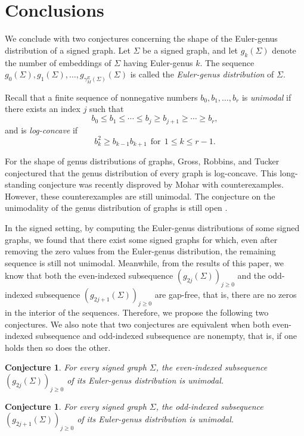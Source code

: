 \documentclass[12pt]{article}
\newtheorem{conjecture}[theorem]{Conjecture}
\theoremstyle{definition}
\begin{document}
\section{Conclusions}\label{Sec:5}

We conclude with two conjectures concerning the shape of the Euler-genus distribution of a signed graph. Let $\Sigma$ be a signed graph, and let $g_k(\Sigma)$ denote the number of embeddings of $\Sigma$ having Euler-genus $k$. The sequence
$g_0(\Sigma),g_1(\Sigma),\ldots,g_{\gamma_M^E(\Sigma)}(\Sigma)$
is called the \emph{Euler-genus distribution} of $\Sigma$.

Recall that a finite sequence of nonnegative numbers
$b_0,b_1,\ldots,b_r$ is \emph{unimodal} if there exists an index $j$
such that
$$b_0\leq b_1\leq\cdots\leq b_j\geq b_{j+1}\geq\cdots\geq b_r,$$ and is {\it log-concave} if
$$b_k^2\geq b_{k-1}b_{k+1}~~\mbox{for}~~1\leq k\leq r-1.$$

For the  shape of genus distributions  of graphs, Gross, Robbins, and Tucker
\cite{GrossRobbinsTucker1989} conjectured that the genus distribution
of every graph is log-concave. This long-standing conjecture was
recently disproved by Mohar \cite{Mohar2026} with counterexamples. However, these counterexamples are still unimodal. The conjecture on the unimodality
of the genus distribution of graphs is still open \cite{Mohar2026}.


In the signed setting, by computing the Euler-genus distributions of some signed graphs, we found that there exist some signed graphs for which, even after removing the zero values from the Euler-genus distribution, the remaining sequence is still not unimodal. Meanwhile, from the results of this paper, we know that both the even-indexed subsequence $
\left(g_{2j}(\Sigma)\right)_
{j\geq 0}
$ and the odd-indexed subsequence $
\left(g_{2j+1}(\Sigma)\right)_
{j\geq 0}
$ are gap-free, that is, there are no zeros in the interior of the sequences. Therefore, we propose the following two conjectures. We also note that two conjectures are equivalent when both   even-indexed subsequence and odd-indexed subsequence are nonempty, that is, if one holds then so does the other.

\begin{conjecture}
For every signed graph $\Sigma$, the even-indexed subsequence
$
\left(g_{2j}(\Sigma)\right)_
{j\geq 0}
$
of its Euler-genus distribution is unimodal.
\end{conjecture}

\begin{conjecture}
For every signed graph $\Sigma$, the odd-indexed subsequence
$
\left(g_{2j+1}(\Sigma)\right)_
{j\geq 0}
$
of its Euler-genus distribution is unimodal.
\end{conjecture}
\end{document}
